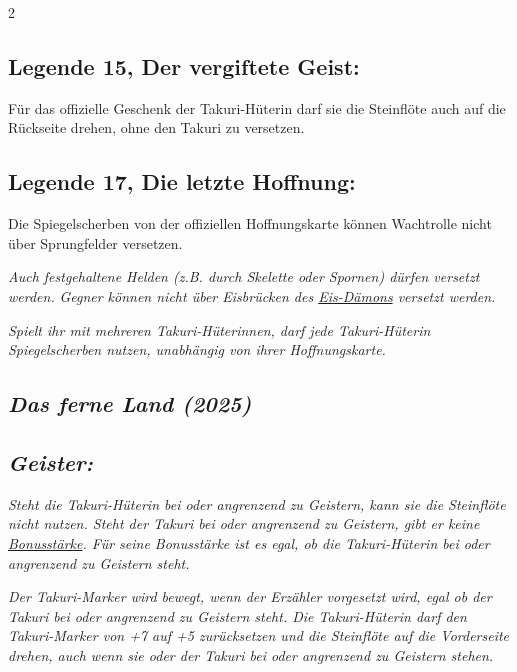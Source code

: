 \documentclass[10pt, a4paper, oneside]{book}
\newcommand{\fan}[1]{\textit{#1}}
\begin{document}
\begin{multicols*}{2}
\begin{bgcolor}
\subsection{Legende 15, Der vergiftete Geist:}

Für das offizielle Geschenk der Takuri-Hüterin darf sie die Steinflöte auch auf die Rückseite drehen, ohne den Takuri zu versetzen.
\supercite{MH:Begleitheft}


\subsection{Legende 17, Die letzte Hoffnung:}

Die Spiegelscherben von der offiziellen Hoffnungskarte können Wachtrolle nicht über Sprungfelder versetzen. 
\supercite{MH:Begleitheft}

\fan{Auch festgehaltene Helden (z.B. durch Skelette oder Spornen) dürfen versetzt werden.}
\fan{Gegner können nicht über Eisbrücken des \hyperref[Eis-Dämon]{Eis-Dämons} versetzt werden.}

\fan{Spielt ihr mit mehreren Takuri-Hüterinnen, darf jede Takuri-Hüterin Spiegelscherben nutzen, unabhängig von ihrer Hoffnungskarte.}

\end{bgcolor}


\columnbreak



\begin{bgcolor}
\section{\fan{Das ferne Land (2025)}}



\subsection{\fan{Geister:}}

\fan{Steht die Takuri-Hüterin bei oder angrenzend zu Geistern, kann sie die Steinflöte nicht nutzen. Steht der Takuri bei oder angrenzend zu Geistern, gibt er keine \hyperref[Bonusstärke]{Bonusstärke}. Für seine Bonusstärke ist es egal, ob die Takuri-Hüterin bei oder angrenzend zu Geistern steht.}

\fan{Der Takuri-Marker wird bewegt, wenn der Erzähler vorgesetzt wird, egal ob der Takuri bei oder angrenzend zu Geistern steht. Die Takuri-Hüterin darf den Takuri-Marker von +7 auf +5 zurücksetzen und die Steinflöte auf die Vorderseite drehen, auch wenn sie oder der Takuri bei oder angrenzend zu Geistern stehen.}

\end{bgcolor}


\end{multicols*}
\end{document}
